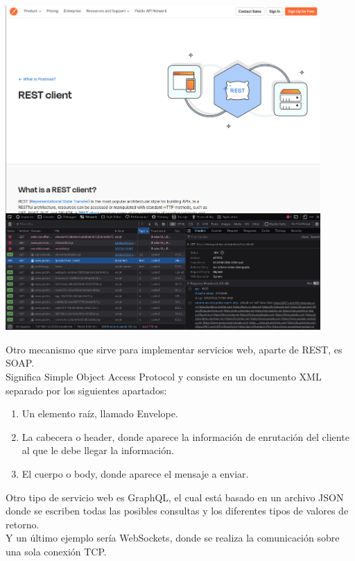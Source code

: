 \documentclass[spanish]{article}
\begin{document}
\begin{center}
\includegraphics[width=12cm]{../img/1.png}
\end{center}

Otro mecanismo que sirve para implementar servicios web,
aparte de REST, es SOAP.\\

Significa Simple Object Access Protocol y consiste en un
documento XML separado por los siguientes apartados:

\begin{enumerate}
\item Un elemento raíz, llamado Envelope.
\item La cabecera o header, donde aparece la información de
enrutación del cliente al que le debe llegar la información.
\item El cuerpo o body, donde aparece el mensaje a enviar.
\end{enumerate}

Otro tipo de servicio web es GraphQL, el cual está basado en
un archivo JSON donde se escriben todas las posibles
consultas y los diferentes tipos de valores de retorno.\\

Y un último ejemplo sería WebSockets, donde se realiza la
comunicación sobre una sola conexión TCP.

\newpage
\end{document}
